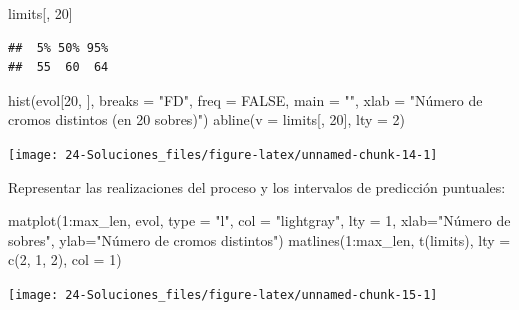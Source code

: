 \documentclass[
]{book}
\newenvironment{Shaded}{\begin{snugshade}}{\end{snugshade}}
\newcommand{\AttributeTok}[1]{\textcolor[rgb]{0.77,0.63,0.00}{#1}}
\newcommand{\ConstantTok}[1]{\textcolor[rgb]{0.00,0.00,0.00}{#1}}
\newcommand{\DecValTok}[1]{\textcolor[rgb]{0.00,0.00,0.81}{#1}}
\newcommand{\FunctionTok}[1]{\textcolor[rgb]{0.00,0.00,0.00}{#1}}
\newcommand{\NormalTok}[1]{#1}
\newcommand{\SpecialCharTok}[1]{\textcolor[rgb]{0.00,0.00,0.00}{#1}}
\newcommand{\StringTok}[1]{\textcolor[rgb]{0.31,0.60,0.02}{#1}}
\theoremstyle{break}
\theoremstyle{nonumberplain}
\begin{document}
\begin{Shaded}
\begin{Highlighting}[]
\NormalTok{limits[, }\DecValTok{20}\NormalTok{]}
\end{Highlighting}
\end{Shaded}

\begin{verbatim}
##  5% 50% 95% 
##  55  60  64
\end{verbatim}

\begin{Shaded}
\begin{Highlighting}[]
\FunctionTok{hist}\NormalTok{(evol[}\DecValTok{20}\NormalTok{, ], }\AttributeTok{breaks =} \StringTok{"FD"}\NormalTok{, }\AttributeTok{freq =} \ConstantTok{FALSE}\NormalTok{,}
     \AttributeTok{main =} \StringTok{""}\NormalTok{, }\AttributeTok{xlab =} \StringTok{"Número de cromos distintos (en 20 sobres)"}\NormalTok{)}
\FunctionTok{abline}\NormalTok{(}\AttributeTok{v =}\NormalTok{ limits[, }\DecValTok{20}\NormalTok{], }\AttributeTok{lty =} \DecValTok{2}\NormalTok{)}
\end{Highlighting}
\end{Shaded}

\begin{center}\texttt{[image: 24-Soluciones\_files/figure-latex/unnamed-chunk-14-1]} \end{center}

Representar las realizaciones del proceso y los intervalos de predicción puntuales:

\begin{Shaded}
\begin{Highlighting}[]
\FunctionTok{matplot}\NormalTok{(}\DecValTok{1}\SpecialCharTok{:}\NormalTok{max\_len, evol, }\AttributeTok{type =} \StringTok{"l"}\NormalTok{, }\AttributeTok{col =} \StringTok{"lightgray"}\NormalTok{, }\AttributeTok{lty =} \DecValTok{1}\NormalTok{,}
    \AttributeTok{xlab=}\StringTok{"Número de sobres"}\NormalTok{, }\AttributeTok{ylab=}\StringTok{"Número de cromos distintos"}\NormalTok{)}
\FunctionTok{matlines}\NormalTok{(}\DecValTok{1}\SpecialCharTok{:}\NormalTok{max\_len, }\FunctionTok{t}\NormalTok{(limits), }\AttributeTok{lty =} \FunctionTok{c}\NormalTok{(}\DecValTok{2}\NormalTok{, }\DecValTok{1}\NormalTok{, }\DecValTok{2}\NormalTok{), }\AttributeTok{col =} \DecValTok{1}\NormalTok{)}
\end{Highlighting}
\end{Shaded}

\begin{center}\texttt{[image: 24-Soluciones\_files/figure-latex/unnamed-chunk-15-1]} \end{center}
\end{document}
